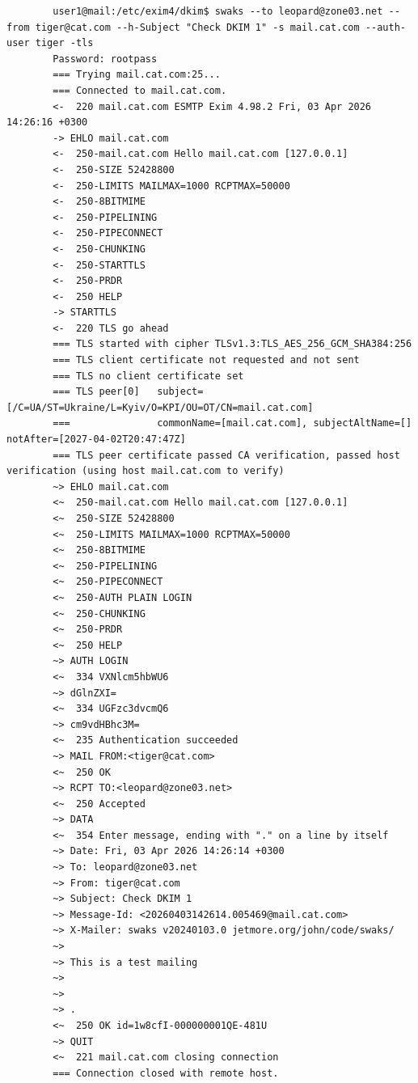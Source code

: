 \documentclass[14pt, a4paper]{extreport}
\begin{document}
	\begin{verbatim}
		user1@mail:/etc/exim4/dkim$ swaks --to leopard@zone03.net --from tiger@cat.com --h-Subject "Check DKIM 1" -s mail.cat.com --auth-user tiger -tls
		Password: rootpass
		=== Trying mail.cat.com:25...
		=== Connected to mail.cat.com.
		<-  220 mail.cat.com ESMTP Exim 4.98.2 Fri, 03 Apr 2026 14:26:16 +0300
		-> EHLO mail.cat.com
		<-  250-mail.cat.com Hello mail.cat.com [127.0.0.1]
		<-  250-SIZE 52428800
		<-  250-LIMITS MAILMAX=1000 RCPTMAX=50000
		<-  250-8BITMIME
		<-  250-PIPELINING
		<-  250-PIPECONNECT
		<-  250-CHUNKING
		<-  250-STARTTLS
		<-  250-PRDR
		<-  250 HELP
		-> STARTTLS
		<-  220 TLS go ahead
		=== TLS started with cipher TLSv1.3:TLS_AES_256_GCM_SHA384:256
		=== TLS client certificate not requested and not sent
		=== TLS no client certificate set
		=== TLS peer[0]   subject=[/C=UA/ST=Ukraine/L=Kyiv/O=KPI/OU=OT/CN=mail.cat.com]
		===               commonName=[mail.cat.com], subjectAltName=[] notAfter=[2027-04-02T20:47:47Z]
		=== TLS peer certificate passed CA verification, passed host verification (using host mail.cat.com to verify)
		~> EHLO mail.cat.com
		<~  250-mail.cat.com Hello mail.cat.com [127.0.0.1]
		<~  250-SIZE 52428800
		<~  250-LIMITS MAILMAX=1000 RCPTMAX=50000
		<~  250-8BITMIME
		<~  250-PIPELINING
		<~  250-PIPECONNECT
		<~  250-AUTH PLAIN LOGIN
		<~  250-CHUNKING
		<~  250-PRDR
		<~  250 HELP
		~> AUTH LOGIN
		<~  334 VXNlcm5hbWU6
		~> dGlnZXI=
		<~  334 UGFzc3dvcmQ6
		~> cm9vdHBhc3M=
		<~  235 Authentication succeeded
		~> MAIL FROM:<tiger@cat.com>
		<~  250 OK
		~> RCPT TO:<leopard@zone03.net>
		<~  250 Accepted
		~> DATA
		<~  354 Enter message, ending with "." on a line by itself
		~> Date: Fri, 03 Apr 2026 14:26:14 +0300
		~> To: leopard@zone03.net
		~> From: tiger@cat.com
		~> Subject: Check DKIM 1
		~> Message-Id: <20260403142614.005469@mail.cat.com>
		~> X-Mailer: swaks v20240103.0 jetmore.org/john/code/swaks/
		~> 
		~> This is a test mailing
		~> 
		~> 
		~> .
		<~  250 OK id=1w8cfI-000000001QE-481U
		~> QUIT
		<~  221 mail.cat.com closing connection
		=== Connection closed with remote host.
		

\end{verbatim}
\end{document}
